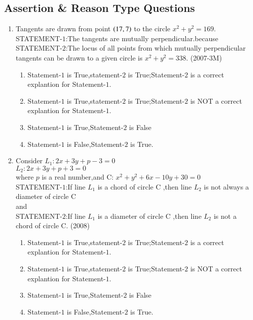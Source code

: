 \documentclass[journal,12pt,twocolumn]{IEEEtran}
\theoremstyle{remark}
\begin{document}
\subsection{Assertion \& Reason Type Questions}
\begin{enumerate}
\item Tangents are drawn from point $\left(17 , 7\right)$ to the circle $x^2+y^2=169$.\\
STATEMENT-$1$:The tangents are mutually perpendicular.because\\
STATEMENT-$2$:The locus of all points from which mutually perpendicular tangents can be drawn to a given circle is $x^2+y^2=338$. \hfill(2007-3M)\\
\begin{enumerate}
\item Statement-$1$ is True,statement-$2$ is True;Statement-$2$ is a correct explantion for Statement-$1$.\\
\item Statement-$1$ is True,statement-$2$ is True;Statement-$2$ is NOT a correct explantion for Statement-$1$.\\
\item Statement-$1$ is True,Statement-$2$ is False\\
\item Statement-$1$ is False,Statement-$2$ is True.\\
\end{enumerate}

\item Consider $L_1:2x+3y+p-3=0$\\
               $L_2:2x+3y+p+3=0$\\
where $p$ is a real number,and C: $x^2+y^2+6x-10y+30=0$\\
STATEMENT-$1$:If line $L_1$ is a chord of circle C ,then line $L_2$ is not always a diameter of circle C\\
and\\
STATEMENT-$2$:If line $L_1$ is a diameter of circle C ,then line $L_2$ is not a chord  of circle C. \hfill(2008)\\
\begin{enumerate}
\item Statement-$1$ is True,statement-$2$ is True;Statement-$2$ is a correct explantion for Statement-$1$.\\
\item Statement-$1$ is True,statement-$2$ is True;Statement-$2$ is NOT a correct explantion for Statement-$1$.\\
\item Statement-$1$ is True,Statement-$2$ is False\\
\item Statement-$1$ is False,Statement-$2$ is True.\\		
\end{enumerate}
\end{enumerate}
\end{document}
